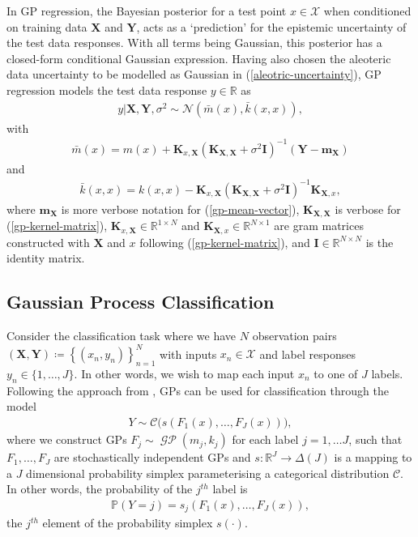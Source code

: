 \documentclass{article}
\newcommand{\GP}{\operatorname{\mathcal{GP}}}
\numberwithin{equation}{section}
\begin{document}
In GP regression, the Bayesian posterior for a test point $x \in \mathcal{X}$ when conditioned on training data $\mathbf{X}$ and $\mathbf{Y}$, acts as a `prediction' for the epistemic uncertainty of the test data responses. With all terms being Gaussian, this posterior has a closed-form conditional Gaussian expression.
Having also chosen the aleoteric data uncertainty to be modelled as Gaussian in (\ref{aleotric-uncertainty}), GP regression models the test data response $y \in \mathbb{R}$ as
\begin{align}
    y \vert \mathbf{X}, \mathbf{Y}, \sigma^2
    \sim \mathcal{N}\left(\bar{m}(x), \bar{k}(x, x)\right),
    \label{gp-posterior-normal}
\end{align}
with
\begin{align}
    \label{gp-posterior-mean}
    \bar{m}(x) = m(x) + \mathbf{K}_{x, \mathbf{X}} \left(\mathbf{K}_{\mathbf{X}, \mathbf{X}} + \sigma^2 \mathbf{I}\right)^{-1} \left( \mathbf{Y} - \mathbf{m}_{\mathbf{X}}\right)
\end{align}
and
\begin{align}
    \label{gp-posterior-covariance}
    \bar{k}(x, x) = k(x, x) - \mathbf{K}_{x, \mathbf{X}} \left(\mathbf{K}_{\mathbf{X}, \mathbf{X}} + \sigma^2 \mathbf{I}\right)^{-1} \mathbf{K}_{\mathbf{X}, x},
\end{align}
where $\mathbf{m}_{\mathbf{X}}$ is more verbose notation for (\ref{gp-mean-vector}), $\mathbf{K}_{\mathbf{X}, \mathbf{X}}$ is verbose for (\ref{gp-kernel-matrix}), $\mathbf{K}_{x, \mathbf{X}} \in \mathbb{R}^{1 \times N}$ and $\mathbf{K}_{\mathbf{X}, x} \in \mathbb{R}^{N \times 1}$ are gram matrices constructed with $\mathbf{X}$ and $x$ following (\ref{gp-kernel-matrix}), and $\mathbf{I} \in \mathbb{R}^{N \times N}$ is the identity matrix.

\subsection{Gaussian Process Classification}
Consider the classification task where we have $N$ observation pairs $(\mathbf{X}, \mathbf{Y}) \coloneqq \left\{(x_n, y_n)\right\}_{n=1}^{N}$ with inputs $x_n \in \mathcal{X}$ and label responses $y_n \in \{1, \dots, J\}$. In other words, we wish to map each input $x_n$ to one of $J$ labels. Following the approach from \cite{matthews2017scalable}, GPs can be used for classification through the model
\begin{align}
    Y \sim \mathcal{C}\Big(s\left(F_1(x), \dots, F_J(x)\right)\Big),
    \label{gp-classifier}
\end{align}
where we construct GPs $F_j \sim \GP\left(m_j, k_j\right)$ for each label $j=1, \dots J$, such that $F_1, \dots, F_J$ are stochastically independent GPs and $s: \mathbb{R}^J \rightarrow \Delta(J)$ is a mapping to a $J$ dimensional probability simplex parameterising a categorical distribution $\mathcal{C}$. In other words, the probability of the $j^{th}$ label is
\begin{align}
    \mathbb{P}(Y=j) = s_j(F_1(x), \dots, F_J(x)),
\end{align}
the $j^{th}$ element of the probability simplex $s(\cdot)$.
\end{document}
